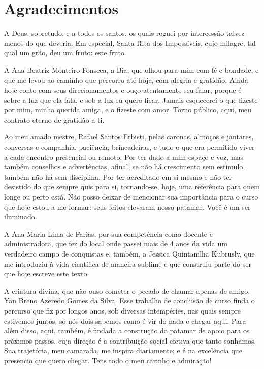 \documentclass[12pt,a4paper,header]{abnt}
\begin{document}
\chapter*{Agradecimentos}

A Deus, sobretudo, e a todos os santos, os quais roguei por intercessão talvez menos do que deveria. Em especial, Santa Rita dos Impossíveis, cujo milagre, tal qual um grão, deu um fruto: este fruto.

A Ana Beatriz Monteiro Fonseca, a Bia, que olhou para mim com fé e bondade, e que me levou ao caminho que percorro até hoje, com alegria e gratidão. Ainda hoje conto com seus direcionamentos e ouço atentamente seu falar, porque é sobre a luz que ela fala, e sob a luz eu quero ficar. Jamais esquecerei o que fizeste por mim, minha querida amiga, e o fizeste com amor. Torno público, aqui, meu contrato eterno de gratidão a ti.

Ao meu amado mestre, Rafael Santos Erbisti, pelas caronas, almoços e jantares, conversas e companhia, paciência, brincadeiras, e tudo o que era permitido viver a cada encontro presencial ou remoto. Por ter dado a mim espaço e voz, mas também conselhos e advertências, afinal, se não há crescimento sem estímulo, também não há sem disciplina. Por ter acreditado em si mesmo e não ter desistido do que sempre quis para si, tornando-se, hoje, uma referência para quem longe ou perto está. Não posso deixar de mencionar sua importância para o curso que hoje estou a me formar: seus feitos elevaram nosso patamar. Você é um ser iluminado.

A Ana Maria Lima de Farias, por sua competência como docente e administradora, que fez do local onde passei mais de 4 anos da vida um verdadeiro campo de conquistas e, também, a Jessica Quintanilha Kubrusly, que me introduziu à vida científica de maneira sublime e que construiu parte do ser que hoje escreve este texto.

A criatura divina, que não ouso cometer o pecado de chamar apenas de amigo, Yan Breno Azeredo Gomes da Silva. Esse trabalho de conclusão de curso finda o percurso que fiz por longos anos, sob diversas intempéries, nas quais sempre estivemos juntos: só nós dois sabemos como é vir do nada e chegar aqui. Para além disso, aqui, também, é findada a construção do patamar de apoio para os próximos passos, cuja direção é a contribuição social efetiva que tanto sonhamos. Sua trajetória, meu camarada, me inspira diariamente; e é na excelência que presencio que quero chegar. Tens todo o meu carinho e admiração!
\end{document}
